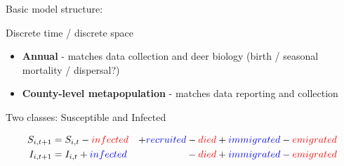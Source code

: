 \documentclass[
  11pt,
  ignorenonframetext,
  aspectratio=43]{beamer}
\begin{document}
\begin{frame}{Basic model structure:}
\protect\hypertarget{basic-model-structure}{}
\begin{block}{Discrete time / discrete space}
\protect\hypertarget{discrete-time-discrete-space}{}
\begin{itemize}
\item
  \textbf{Annual} - matches data collection and deer biology (birth /
  seasonal mortality / dispersal?)
\item
  \textbf{County-level metapopulation} - matches data reporting and
  collection
\end{itemize}
\end{block}

\begin{block}{Two classes: Susceptible and Infected}
\protect\hypertarget{two-classes-susceptible-and-infected}{}
\small

\begin{align}
S_{i,t+1} &= S_{i,t} - \textcolor{red}{infected} & + \textcolor{blue}{recruited}& - \textcolor{red}{died} + \textcolor{blue}{immigrated} - \textcolor{red}{emigrated} \nonumber\\
I_{i, t+1} &= I_{i,t} + \textcolor{blue}{infected} & &  -\textcolor{red}{died} + \textcolor{blue}{immigrated} - \textcolor{red}{emigrated} \nonumber
\end{align}
\end{block}
\end{frame}
\end{document}
